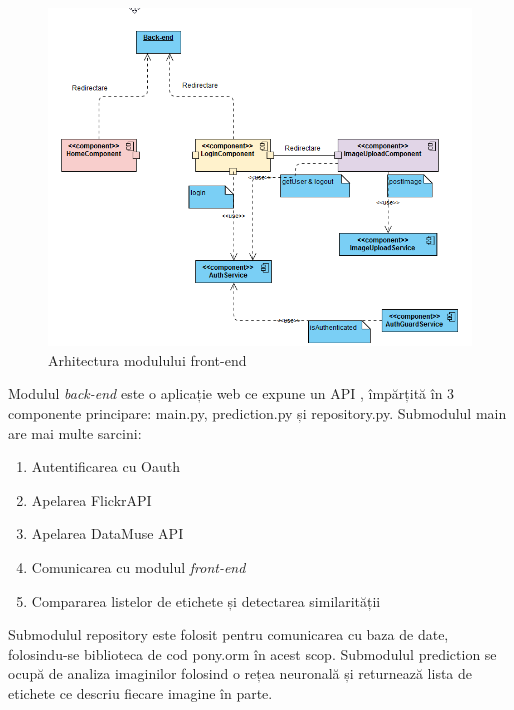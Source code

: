  \begin{figure}[!htbp]
    \begin{center}
        \includegraphics[width=1.0\textwidth]{images/front_end.png}
        \caption{Arhitectura modulului front-end}
    \end{center}
\end{figure}

\pagebreak
Modulul \textit{back-end} este o aplicație web \cite{python-web-applications} ce expune un API , împărțită în 3 componente principare: main.py, prediction.py și repository.py. Submodulul main are mai multe sarcini: 
\begin{enumerate}
    \item Autentificarea cu Oauth
    \item Apelarea FlickrAPI
    \item Apelarea DataMuse API
    \item Comunicarea cu modulul \textit{front-end}
    \item Compararea listelor de etichete și detectarea similarității
\end{enumerate}{}
Submodulul repository este folosit pentru comunicarea cu baza de date, folosindu-se biblioteca de cod pony.orm în acest scop.
Submodulul prediction se ocupă de analiza imaginilor folosind o rețea neuronală și returnează lista de etichete ce descriu fiecare imagine în parte.

